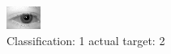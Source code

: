 \begin{figure}[h!]
\begin{center}
\includegraphics[width=0.60\columnwidth]{figures/ID438_class_1_target_2.png}
\end{center}
\caption{ Classification: 1 actual target: 2}
\label{fig:ID438_class_1_target_2}
\end{figure}
